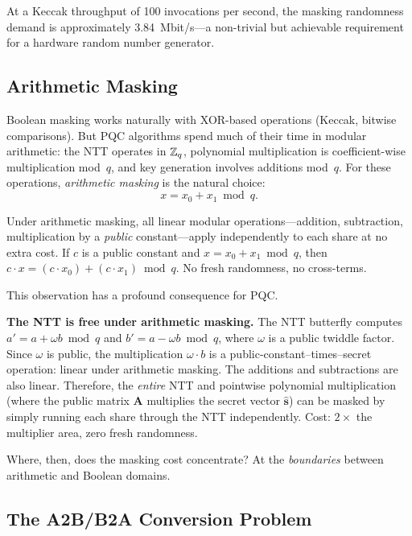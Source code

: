 At a Keccak throughput of 100 invocations per second, the masking randomness demand is approximately 3.84~Mbit/s---a non-trivial but achievable requirement for a hardware random number generator.


\subsection{Arithmetic Masking}
\label{subsec:arithmetic-masking}

Boolean masking works naturally with XOR-based operations (Keccak, bitwise comparisons).  But PQC algorithms spend much of their time in modular arithmetic: the NTT operates in $\mathbb{Z}_q$, polynomial multiplication is coefficient-wise multiplication mod~$q$, and key generation involves additions mod~$q$.  For these operations, \emph{arithmetic masking} is the natural choice:
\begin{equation}
\label{eq:arithmetic-masking}
x = x_0 + x_1 \bmod q.
\end{equation}

Under arithmetic masking, all linear modular operations---addition, subtraction, multiplication by a \emph{public} constant---apply independently to each share at no extra cost.  If $c$ is a public constant and $x = x_0 + x_1 \bmod q$, then $c \cdot x = (c \cdot x_0) + (c \cdot x_1) \bmod q$.  No fresh randomness, no cross-terms.

This observation has a profound consequence for PQC.

\begin{svgraybox}
\textbf{The NTT is free under arithmetic masking.}  The NTT butterfly computes $a' = a + \omega b \bmod q$ and $b' = a - \omega b \bmod q$, where $\omega$ is a public twiddle factor.  Since $\omega$ is public, the multiplication $\omega \cdot b$ is a public-constant--times--secret operation: linear under arithmetic masking.  The additions and subtractions are also linear.  Therefore, the \emph{entire} NTT and pointwise polynomial multiplication (where the public matrix $\mathbf{A}$ multiplies the secret vector $\hat{\mathbf{s}}$) can be masked by simply running each share through the NTT independently.  Cost: $2\times$ the multiplier area, zero fresh randomness.
\end{svgraybox}

Where, then, does the masking cost concentrate?  At the \emph{boundaries} between arithmetic and Boolean domains.


\subsection{The A2B/B2A Conversion Problem}
\label{subsec:a2b-b2a}

